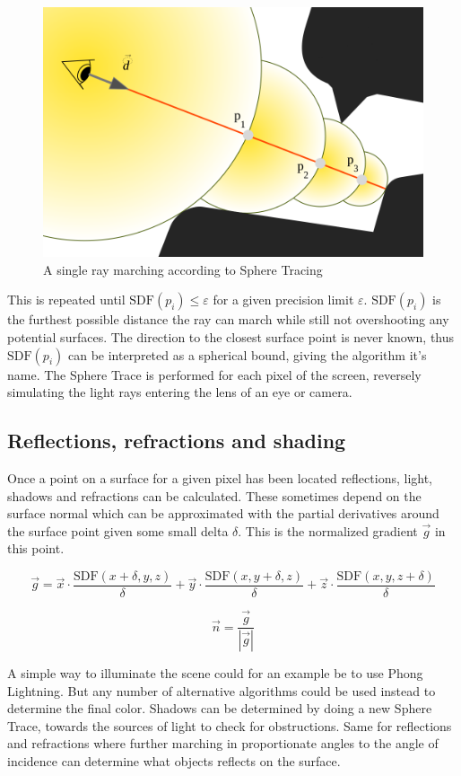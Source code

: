 		\vspace{40pt}
		\begin{figure}
			\begin{flushright}
				\includegraphics[width=0.9\linewidth]{figure/SDF2} 
			\end{flushright}
			\caption{A single ray marching according to Sphere Tracing}
			\vspace{40pt}
		\end{figure}

		This is repeated until $\text{SDF}(p_i) \leq \varepsilon$ for a given
		precision limit $\varepsilon$. $\text{SDF}(p_i)$ is the furthest possible
	 distance the ray can march while still not overshooting any potential
		surfaces. The direction to the closest surface point is never known, thus
		$\text{SDF}(p_i)$ can be interpreted as a spherical bound, giving the
		algorithm it's name. The Sphere Trace is performed for each pixel of the
		screen, reversely simulating the light rays entering the lens of an eye or
		camera.

			\subsection{Reflections, refractions and shading}

				Once a point on a surface for a given pixel has been located
				reflections, light, shadows and refractions can be calculated. These sometimes depend on the surface normal which can be approximated with
				the partial derivatives around the surface point given some small delta
				$\delta$. This is the normalized gradient $\vec{g}$ in this point.

				$$\vec{g} = \vec{x}\cdot\frac{\text{SDF}(x+\delta, y, z)}{\delta} +
				\vec{y}\cdot\frac{\text{SDF}(x, y+\delta, z)}{\delta} +
				\vec{z}\cdot\frac{\text{SDF}(x, y, z+\delta)}{\delta} $$

				$$\vec{n} = \frac{\vec{g}}{|\vec{g}|} $$

				A simple way to illuminate the scene could for an example be to use
				Phong Lightning\cite{Phong1975}. But any number of alternative
				algorithms could be used instead to determine the final color. Shadows
				can be determined by doing a new Sphere Trace, towards the sources of
				light to check for obstructions. Same for reflections and refractions
				where further marching in proportionate angles to the angle of
				incidence can determine what objects reflects on the surface.
